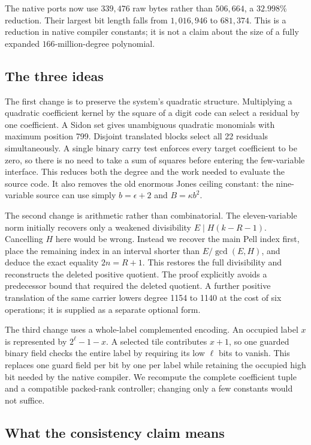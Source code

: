 The native ports now use $339{,}476$ raw bytes rather than $506{,}664$,
a $32.998\%$ reduction. Their largest bit length falls from
$1{,}016{,}946$ to $681{,}374$. This is a reduction in native compiler
constants; it is not a claim about the size of a fully expanded
$166$-million-degree polynomial.

\subsection{The three ideas}

The first change is to preserve the system's quadratic structure.
Multiplying a quadratic coefficient kernel by the square of a digit code
can select a residual by one coefficient. A Sidon set gives unambiguous
quadratic monomials with maximum position 799. Disjoint translated
blocks select all 22 residuals simultaneously. A single binary carry
test enforces every target coefficient to be zero, so there is no need
to take a sum of squares before entering the few-variable interface.
This reduces both the degree and the work needed to evaluate the source
code. It also removes the old enormous Jones ceiling constant: the
nine-variable source can use simply $b=\epsilon+2$ and
$B=\kappa b^2$.

The second change is arithmetic rather than combinatorial. The
eleven-variable norm initially recovers only a weakened divisibility
$E\mid H(k-R-1)$. Cancelling $H$ here would be wrong. Instead we
recover the main Pell index first, place the remaining index in an
interval shorter than $E/\gcd(E,H)$, and deduce the exact equality
$2n=R+1$. This restores the full divisibility and reconstructs the
deleted positive quotient. The proof explicitly avoids a predecessor
bound that required the deleted quotient.
A further positive translation of the same carrier lowers degree 1154
to 1140 at the cost of six operations; it is supplied as a separate
optional form.

The third change uses a whole-label complemented encoding. An occupied
label $x$ is represented by $2^\ell-1-x$. A selected tile contributes
$x+1$, so one guarded binary field checks the entire label by requiring
its low $\ell$ bits to vanish. This replaces one guard field per bit
by one per label while retaining the occupied high bit needed by the
native compiler. We recompute the complete coefficient tuple and a
compatible packed-rank controller; changing only a few constants would
not suffice.

\subsection{What the consistency claim means}

